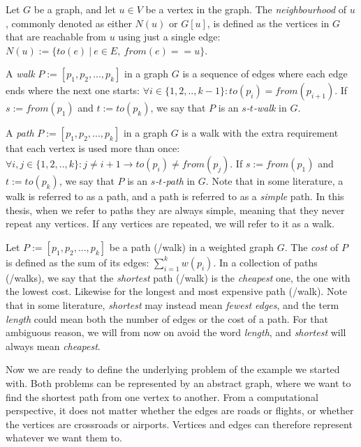 \begin{definition}[Neighbourhood]
    Let $G$ be a graph, and let $u \in V$ be a vertex in the graph. The \emph{neighbourhood} of $u$, commonly denoted as either $N(u)$ or $G[u]$, is defined as the vertices in $G$ that are reachable from $u$ using just a single edge: $N(u) := \{ to(e)  ~|~  e \in E, ~ from(e) == u\}$.
\end{definition}

\begin{definition}[Walk]
    A \emph{walk} $P := [p_1, p_2, ..., p_k]$ in a graph $G$ is a sequence of edges where each edge ends where the next one starts: $\forall i \in \{1,2,..,k-1\} : to(p_i) = from(p_{i+1})$.
    If $s := from(p_1)$ and $t := to(p_k)$, we say that $P$ is an \emph{$s$-$t$-walk} in $G$.
\end{definition}

\begin{definition}[Path]
    A \emph{path} $P := [p_1, p_2, ..., p_k]$ in a graph $G$ is a walk with the extra requirement that each vertex is used more than once: $\forall i, j \in \{1,2,..,k\} : j \neq {i+1} \rightarrow to(p_i) \neq from(p_j)$.
    If $s := from(p_1)$ and $t := to(p_k)$, we say that $P$ is an \emph{$s$-$t$-path} in $G$.
    Note that in some literature, a walk is referred to as a path, and a path is referred to as a \emph{simple} path. In this thesis, when we refer to paths they are always simple, meaning that they never repeat any vertices. If any vertices are repeated, we will refer to it as a walk.    
\end{definition}

\begin{definition}
    Let $P := [p_1, p_2, ..., p_k]$ be a path (/walk) in a weighted graph $G$. The \emph{cost} of $P$ is defined as the sum of its edges: $\sum_{i=1}^k w(p_i)$. In a collection of paths (/walks), we say that the \emph{shortest} path (/walk) is the \emph{cheapest} one, the one with the lowest cost. Likewise for the longest and most expensive path (/walk). Note that in some literature, \emph{shortest} may instead mean \emph{fewest edges}, and the term \emph{length} could mean both the number of edges or the cost of a path. For that ambiguous reason, we will from now on avoid the word \emph{length}, and \emph{shortest} will always mean \emph{cheapest}.
\end{definition}

Now we are ready to define the underlying problem of the example we started with. Both problems can be represented by an abstract graph, where we want to find the shortest path from one vertex to another. From a computational perspective, it does not matter whether the edges are roads or flights, or whether the vertices are crossroads or airports. Vertices and edges can therefore represent whatever we want them to.

